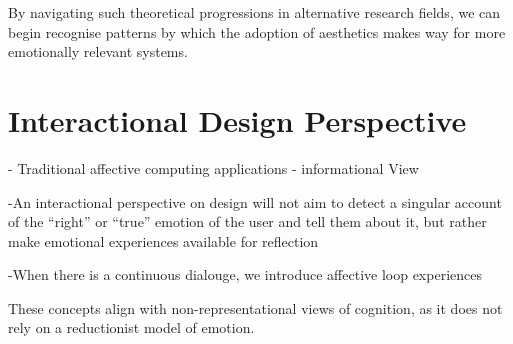 By navigating such theoretical progressions in alternative research fields, we can begin recognise patterns by which the adoption of aesthetics makes way for more emotionally relevant systems.

\section{Interactional Design Perspective}

- Traditional affective computing applications - informational View

-An  interactional  perspective  on  design  will  not aim to detect a singular account of the “right” or “true” emotion  of  the  user  and  tell  them  about  it,  but  rather  make  emotional  experiences  available  for  reflection

-When there is a continuous dialouge, we introduce affective loop experiences

These concepts align with non-representational views of cognition, as it does not rely on a reductionist model of emotion.

